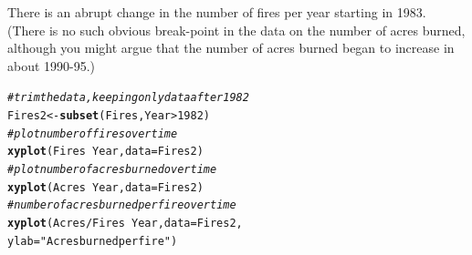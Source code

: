 \documentclass[twoside]{book}\usepackage[]{graphicx}\usepackage[]{xcolor}
\makeatletter
\newcommand{\hlnum}[1]{\textcolor[rgb]{0.686,0.059,0.569}{#1}}%
\newcommand{\hlstr}[1]{\textcolor[rgb]{0.192,0.494,0.8}{#1}}%
\newcommand{\hlcom}[1]{\textcolor[rgb]{0.678,0.584,0.686}{\textit{#1}}}%
\newcommand{\hlopt}[1]{\textcolor[rgb]{0,0,0}{#1}}%
\newcommand{\hlstd}[1]{\textcolor[rgb]{0.345,0.345,0.345}{#1}}%
\newcommand{\hlkwb}[1]{\textcolor[rgb]{0.69,0.353,0.396}{#1}}%
\newcommand{\hlkwc}[1]{\textcolor[rgb]{0.333,0.667,0.333}{#1}}%
\newcommand{\hlkwd}[1]{\textcolor[rgb]{0.737,0.353,0.396}{\textbf{#1}}}%
\newenvironment{kframe}{%
 \def\at@end@of@kframe{}%
 \ifinner\ifhmode%
  \def\at@end@of@kframe{\end{minipage}}%
  \begin{minipage}{\columnwidth}%
 \fi\fi%
 \def\FrameCommand##1{\hskip\@totalleftmargin \hskip-\fboxsep
 \colorbox{shadecolor}{##1}\hskip-\fboxsep
     \hskip-\linewidth \hskip-\@totalleftmargin \hskip\columnwidth}%
 \MakeFramed {\advance\hsize-\width
   \@totalleftmargin\z@ \linewidth\hsize
   \@setminipage}}%
 {\par\unskip\endMakeFramed%
 \at@end@of@kframe}
\newenvironment{knitrout}{}{} %
\makeatother
\begin{document}
\begin{solution}
\begin{knitrout}
{}



\end{knitrout}
There is an abrupt change in the number of fires per year starting in 1983. (There is no such obvious break-point in the data on the number of acres burned, although you might argue that the number of acres burned began to increase in about 1990-95.)

\begin{knitrout}
\color{fgcolor}\begin{kframe}
\begin{alltt}
\hlcom{#trim the data, keeping only data after 1982}
\hlstd{Fires2} \hlkwb{<-} \hlkwd{subset}\hlstd{(Fires, Year} \hlopt{>} \hlnum{1982}\hlstd{)}
\hlcom{#plot number of fires over time}
\hlkwd{xyplot}\hlstd{(Fires} \hlopt{~} \hlstd{Year,} \hlkwc{data}\hlstd{=Fires2)}
\hlcom{#plot number of acres burned over time}
\hlkwd{xyplot}\hlstd{(Acres} \hlopt{~} \hlstd{Year,} \hlkwc{data}\hlstd{=Fires2)}
\hlcom{#number of acres burned per fire over time}
\hlkwd{xyplot}\hlstd{(Acres}\hlopt{/}\hlstd{Fires} \hlopt{~} \hlstd{Year,} \hlkwc{data}\hlstd{=Fires2,}
       \hlkwc{ylab}\hlstd{=}\hlstr{"Acres burned per fire"}\hlstd{)}
\end{alltt}
\end{kframe}


\end{knitrout}
\end{solution}
\end{document}
